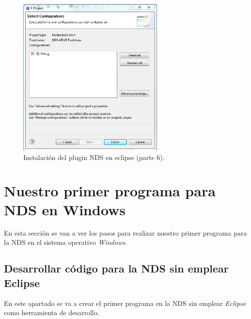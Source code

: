 \newpage

\begin{figure}[h]
\centering
\includegraphics[height=8cm]{./Figuras/C2/c2_instalar_windows8.png}
\caption{Instalación del plugin NDS en eclipse (parte 6).}
\label{fig_c2_win8}
\end{figure}


\section{Nuestro primer programa para NDS en Windows}
En esta sección se van a ver los pasos para realizar nuestro primer programa para la NDS en el sistema operativo \textit{Windows}. 


\subsection{Desarrollar código para la NDS sin emplear Eclipse}
En este apartado se va a crear el primer programa en la NDS sin emplear \textit{Eclipse} como herramienta de desarrollo.

